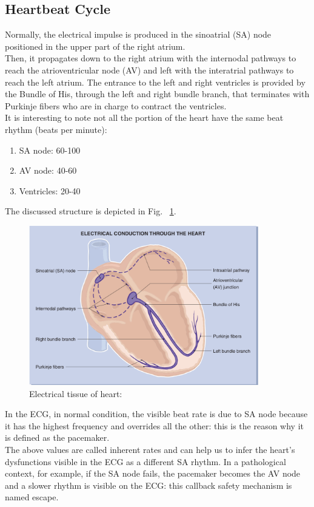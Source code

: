 \documentclass[LaM,binding=0.6cm]{sapthesis}
\begin{document}
\subsection{Heartbeat Cycle}
Normally, the electrical impulse is produced in the sinoatrial (SA) node positioned in the upper part of the right atrium.\\Then, it propagates down to the right atrium with the internodal pathways to reach the atrioventricular node (AV) and left with the interatrial pathways to reach the left atrium. The entrance to the left and right ventricles is provided by the Bundle of His, through the left and right bundle branch, that terminates with Purkinje fibers who are in charge to contract the ventricles.\\It is interesting to note not all the portion of the heart have the same beat rhythm (beats per minute):
\begin{enumerate}
\item SA node: 60-100  
\item AV node: 40-60 
\item Ventricles: 20-40 
\end{enumerate}
The discussed structure is depicted in Fig. ~\ref{fig:hearts}.
\begin{figure} \centering
    \includegraphics[width=100mm,scale=0.7]{heartex}
    \caption{Electrical tissue of heart: \cite{ecgbook}}
    \label{fig:hearts}
\end{figure}
In the ECG, in normal condition, the visible beat rate is due to SA node because it has the highest frequency and overrides all the other: this is the reason why it is defined as the pacemaker.\\The above values are called inherent rates and can help us to infer the heart's dysfunctions visible in the ECG as a different SA rhythm. In a pathological context, for example, if the SA node fails, the pacemaker becomes the AV node and a slower rhythm is visible on the ECG: this callback safety mechanism is named escape.
\end{document}
